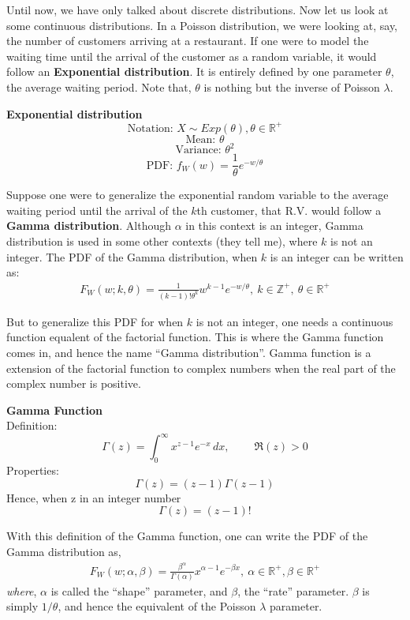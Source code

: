Until now, we have only talked about discrete distributions. Now let us look at some continuous distributions. In a Poisson distribution, we were looking at, say, the number of customers arriving at a restaurant. If one were to model the waiting time until the arrival of the customer as a random variable, it would follow an \textbf{Exponential distribution}. It is entirely defined by one parameter $\theta$, the average waiting period. Note that, $\theta$ is nothing but the inverse of Poisson $\lambda$. 

	\begin{highlightedText}
		\textbf{Exponential  distribution} 
		\[ \text{Notation: }  X \sim Exp(\theta), \theta \in \mathbb{R}^+ \] 			
		\[ \text{Mean: } \theta \] 						
		\[ \text{Variance: } \theta^2 \] 						
		\[ \text{PDF: } f_W(w) =  \frac{1}{\theta}e^{-w/\theta} \] 
	\end{highlightedText}

Suppose one were to generalize the exponential random variable to the average waiting period until the arrival of the $k$th customer, that R.V. would follow a \textbf{Gamma distribution}. Although $\alpha$ in this context is an integer, Gamma distribution is used in some other contexts (they tell me), where $k$ is not an integer. The PDF of the Gamma distribution, when $k$ is an integer can be written as:
	\begin{align*}
		F_W(w;k,\theta) = \frac{1}{(k-1)! \theta^k} w^{k - 1} e^{-w/\theta},\ k \in \mathbb{Z}^+,\ \theta \in \mathbb{R}^+
	\end{align*}

But to generalize this PDF for when $k$ is not an integer, one needs a continuous function equalent of the factorial function. This is where the Gamma function comes in, and hence the name ``Gamma distribution''. Gamma function is a extension of the factorial function to complex numbers when the real part of the complex number is positive. 
	\begin{highlightedText}
	\textbf{Gamma Function} \\
	Definition: 
	\[ \Gamma(z) = \int_0^\infty x^{z-1} e^{-x}\,dx, \ \qquad \Re(z) > 0 \]
	Properties: 
	\[ \Gamma(z) = (z-1)\Gamma(z-1) \]
	Hence, when z in an integer number
	\[ \Gamma(z) = (z-1)! \]
	\end{highlightedText}

With this definition of the Gamma function, one can write the PDF of the Gamma distribution as, 
	\begin{align*}
	F_W(w;\alpha,\beta) = \frac{\beta^\alpha}{\Gamma(\alpha)} x^{\alpha - 1} e^{-\beta x},\ \alpha \in \mathbb{R}^+, \beta \in \mathbb{R}^+ 
	\end{align*}
\emph{where}, $\alpha$ is called the ``shape'' parameter, and $\beta$, the ``rate'' parameter. $\beta$ is simply $1/\theta$, and hence the equivalent of the Poisson $\lambda$ parameter.

